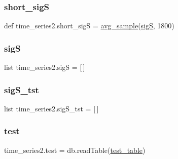 \subsubsection{\texorpdfstring{short\+\_\+sigS}{short\_sigS}}
{\footnotesize\ttfamily def time\+\_\+series2.\+short\+\_\+sigS = \mbox{\hyperlink{namespacetime__series2_a831b2ebbb3b93f1a189a11b798867bf2}{avg\+\_\+sample}}(\mbox{\hyperlink{namespacetime__series2_a7f4c741d69814ab642aaeb0d3ba3c6dd}{sigS}}, 1800)}

\mbox{\label{namespacetime__series2_a7f4c741d69814ab642aaeb0d3ba3c6dd}} 
\subsubsection{\texorpdfstring{sigS}{sigS}}
{\footnotesize\ttfamily list time\+\_\+series2.\+sigS = \mbox{[}$\,$\mbox{]}}

\mbox{\label{namespacetime__series2_afe062e2326a14ed5b7bb7084a7ec5be3}} 
\subsubsection{\texorpdfstring{sig\+S\+\_\+tst}{sigS\_tst}}
{\footnotesize\ttfamily list time\+\_\+series2.\+sig\+S\+\_\+tst = \mbox{[}$\,$\mbox{]}}

\mbox{\label{namespacetime__series2_a1db23c9847b01280de0f7b35c02ec33d}} 
\subsubsection{\texorpdfstring{test}{test}}
{\footnotesize\ttfamily time\+\_\+series2.\+test = db.\+read\+Table(\mbox{\hyperlink{namespacetime__series2_aae4b3d023bcc07d4610b83f328c9c817}{test\+\_\+table}})}

\mbox{\label{namespacetime__series2_ac919557d9139430fa99c37bb9847b34a}} 
